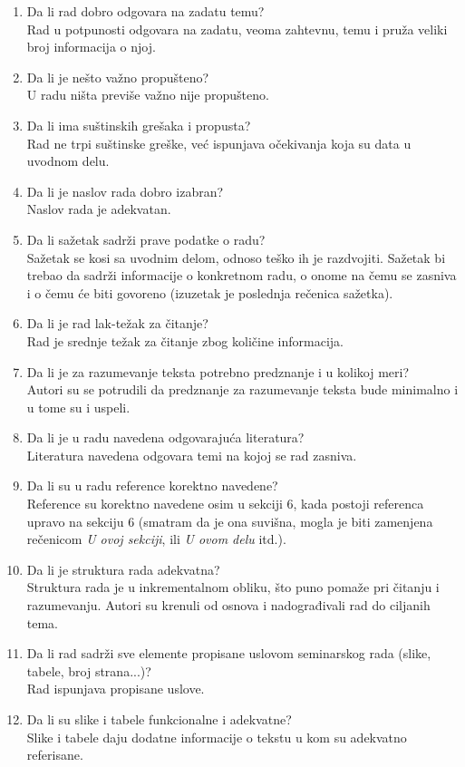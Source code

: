 \documentclass[a4paper]{report}
\newcommand{\say}[1]{\textit{#1}}
\begin{document}
\begin{enumerate}
\item Da li rad dobro odgovara na zadatu temu?\\
Rad u potpunosti odgovara na zadatu, veoma zahtevnu, temu i pruža veliki broj informacija o njoj.
\item Da li je nešto važno propušteno?\\
U radu ništa previše važno nije propušteno.
\item Da li ima suštinskih grešaka i propusta?\\
Rad ne trpi suštinske greške, već ispunjava očekivanja koja su data u uvodnom delu.
\item Da li je naslov rada dobro izabran?\\
Naslov rada je adekvatan.
\item Da li sažetak sadrži prave podatke o radu?\\
Sažetak se kosi sa uvodnim delom, odnoso teško ih je razdvojiti. Sažetak bi trebao da sadrži informacije o konkretnom radu, o onome na čemu se zasniva i o čemu će biti govoreno (izuzetak je poslednja rečenica sažetka).
\item Da li je rad lak-težak za čitanje?\\
Rad je srednje težak za čitanje zbog količine informacija.
\item Da li je za razumevanje teksta potrebno predznanje i u kolikoj meri?\\
Autori su se potrudili da predznanje za razumevanje teksta bude minimalno i u tome su i uspeli.
\item Da li je u radu navedena odgovarajuća literatura?\\
Literatura navedena odgovara temi na kojoj se rad zasniva.
\item Da li su u radu reference korektno navedene?\\
Reference su korektno navedene osim u sekciji 6, kada postoji referenca upravo na sekciju 6 (smatram da je ona suvišna, mogla je biti zamenjena rečenicom \say{U ovoj sekciji}, ili \say{U ovom delu} itd.).
\item Da li je struktura rada adekvatna?\\
Struktura rada je u inkrementalnom obliku, što puno pomaže pri čitanju i razumevanju. Autori su krenuli od osnova i nadograđivali rad do ciljanih tema.
\item Da li rad sadrži sve elemente propisane uslovom seminarskog rada (slike, tabele, broj strana...)?\\
Rad ispunjava propisane uslove.
\item Da li su slike i tabele funkcionalne i adekvatne?\\
Slike i tabele daju dodatne informacije o tekstu u kom su adekvatno referisane.
\end{enumerate}
\end{document}
